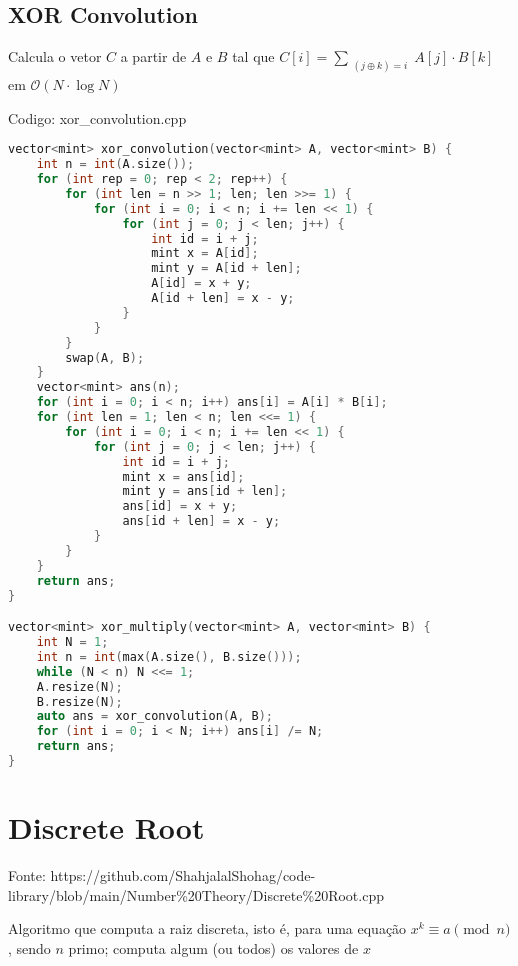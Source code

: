 \documentclass[10pt, a4paper, oneside]{book}
\begin{document}
\subsection{XOR Convolution}


Calcula o vetor $C$ a partir de $A$ e $B$ tal que $C[i] = \sum_{\substack{(j \oplus k) = i}} A[j] \cdot B[k]$ em $\mathcal{O}(N \cdot \log N)$

\hfill

Codigo: xor\_convolution.cpp

\begin{lstlisting}[language=C++]
vector<mint> xor_convolution(vector<mint> A, vector<mint> B) {
    int n = int(A.size());
    for (int rep = 0; rep < 2; rep++) {
        for (int len = n >> 1; len; len >>= 1) {
            for (int i = 0; i < n; i += len << 1) {
                for (int j = 0; j < len; j++) {
                    int id = i + j;
                    mint x = A[id];
                    mint y = A[id + len];
                    A[id] = x + y;
                    A[id + len] = x - y;
                }
            }
        }
        swap(A, B);
    }
    vector<mint> ans(n);
    for (int i = 0; i < n; i++) ans[i] = A[i] * B[i];
    for (int len = 1; len < n; len <<= 1) {
        for (int i = 0; i < n; i += len << 1) {
            for (int j = 0; j < len; j++) {
                int id = i + j;
                mint x = ans[id];
                mint y = ans[id + len];
                ans[id] = x + y;
                ans[id + len] = x - y;
            }
        }
    }
    return ans;
}

vector<mint> xor_multiply(vector<mint> A, vector<mint> B) {
    int N = 1;
    int n = int(max(A.size(), B.size()));
    while (N < n) N <<= 1;
    A.resize(N);
    B.resize(N);
    auto ans = xor_convolution(A, B);
    for (int i = 0; i < N; i++) ans[i] /= N;
    return ans;
}
\end{lstlisting}
\hfill

\section{Discrete Root}


Fonte: https://github.com/ShahjalalShohag/code-library/blob/main/Number\%20Theory/Discrete\%20Root.cpp



Algoritmo que computa a raiz discreta, isto é, para uma equação $x^k \equiv a \pmod{n}$, sendo $n$ primo; computa algum (ou todos) os valores de $x$
\end{document}
